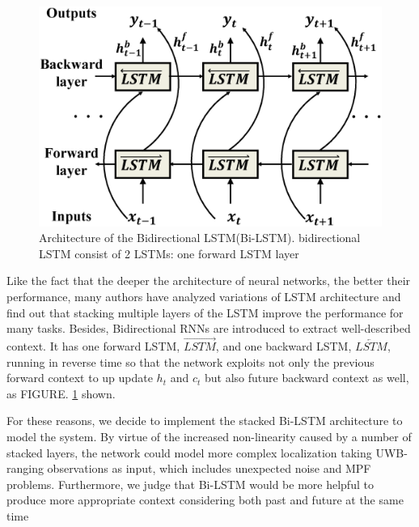 \documentclass[letterpaper, 10 pt, conference]{ieeeconf}  %
\begin{document}
\begin{figure}[h!]
	\centering
	\includegraphics[width=.9\linewidth]{image/bidirectional_LSTM_revised}
	\caption{Architecture of the Bidirectional LSTM(Bi-LSTM). bidirectional LSTM consist of 2 LSTMs:  one forward LSTM layer}
	
	\label{fig:bidirectional_revised}	
\end{figure}

Like the fact that the deeper the architecture of neural networks, the better their performance\cite{simonyan2014very, he2016deep}, many authors have analyzed variations of LSTM architecture and find out that stacking multiple layers of the LSTM improve the performance for many tasks\cite{graves2013hybrid, graves2013speech,ullah2018action}. Besides, Bidirectional RNNs are introduced\cite{schuster1997bidirectional} to extract well-described context. It has one forward LSTM, $\overrightarrow{LSTM}$, and one backward LSTM, $\overleftarrow{LSTM}$, running in reverse time so that the network exploits not only the previous forward context to up update $h_{t}$ and $c_{t}$ but also future backward context as well, as FIGURE. \ref{fig:bidirectional_revised} shown. 

For these reasons, we decide to implement the stacked Bi-LSTM architecture to model the system. By virtue of the increased non-linearity caused by a number of stacked layers, the network could model more complex localization taking UWB-ranging observations as input, which includes unexpected noise and MPF problems. Furthermore, we judge that Bi-LSTM would be more helpful to produce more appropriate context considering both past and future at the same time
\end{document}
